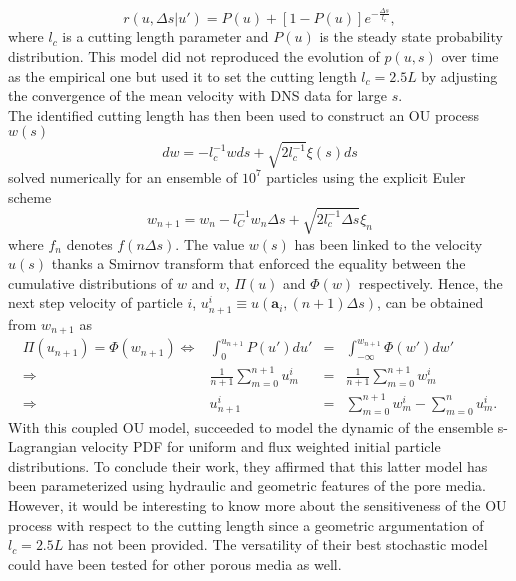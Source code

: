 \begin{equation}\label{eq:bernoulli}
r(u,\Delta s|u')=P(u) + [1 - P(u)] e^{-\frac{\Delta s}{l_c}},
\end{equation}
where $l_c$ is a cutting length parameter and $P(u)$ is the steady state probability distribution. 
This model did not reproduced the evolution of $p(u,s)$ over time as the empirical one but \citeauthor{Puyguiraud2019} used it to set the cutting length $l_c=2.5L$ by adjusting the convergence of the mean velocity with DNS data for large $s$. \\
The identified cutting length has then been used to construct an OU process $w(s)$
\[
dw = -l_c^{-1}wds + \sqrt{2l_c^{-1}}\xi(s)ds
\]
solved numerically for an ensemble of $10^7$ particles using the explicit Euler scheme 
\[
w_{n+1}=w_n-l_C^{-1}w_n\Delta s + \sqrt{2l_c^{-1}\Delta s}\xi_n
\]
where $f_n$ denotes $f(n\Delta s)$.
The value $w(s)$ has been linked to the velocity $u(s)$ thanks a Smirnov transform that enforced the equality between the cumulative distributions of $w$ and $v$, $\Pi(u)$ and $\Phi(w)$ respectively. 
Hence, the next step velocity of particle $i$, $u_{n+1}^i\equiv u(\textbf{a}_i,(n+1)\Delta s)$, can be obtained from $w_{n+1}$ as
\[
\begin{array}{rrcl}
\Pi(u_{n+1}) = \Phi(w_{n+1}) \Leftrightarrow& \int_0^{u_{n+1}} P(u')du' &=& \int_{-\infty}^{w_{n+1}}\Phi(w')dw'\\
\Rightarrow& \frac{1}{n+1}\sum_{m=0}^{n+1}u^i_m&=&\frac{1}{n+1}\sum_{m=0}^{n+1}w^i_m\\
\Rightarrow & u^i_{n+1} &=& \sum_{m=0}^{n+1}w^i_m - \sum_{m=0}^{n}u^i_m.
\end{array}
\]
With this coupled OU model, \citeauthor{Puyguiraud2019} succeeded to model the dynamic of the ensemble s-Lagrangian velocity PDF for uniform and flux weighted initial particle distributions.
To conclude their work, they affirmed that this latter model has been parameterized using hydraulic and geometric features of the pore media. 
However, it would be interesting to know more about the sensitiveness of the OU process with respect to the cutting length since a geometric argumentation of $l_c=2.5L$ has not been provided.
The versatility of their best stochastic model could have been tested for other porous media as well.

